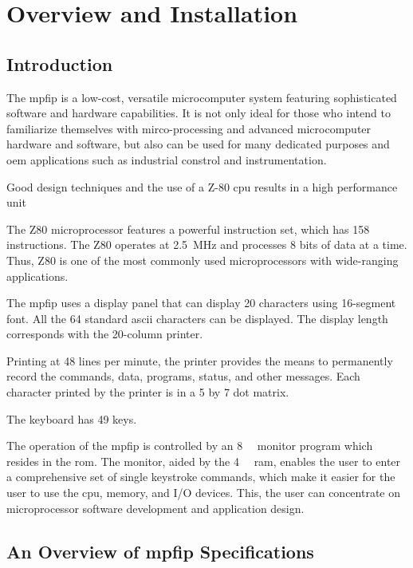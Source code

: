\chapter{Overview and Installation}

\section{Introduction}

The \gls{mpfip} is a low-cost, versatile microcomputer system featuring sophisticated software and hardware capabilities.
It is not only ideal for those who intend to familiarize themselves with mirco-processing and advanced microcomputer hardware and software, but also can be used for many dedicated purposes and \gls{oem} applications such as industrial constrol and instrumentation.

Good design techniques and the use of a Z-80 \gls{cpu} results in a high performance unit

The Z80 microprocessor features a powerful instruction set, which has 158 instructions.
The Z80 operates at \SI{2.5}{\MHz} and processes 8 bits of data at a time. Thus, Z80 is one of the most commonly used microprocessors with wide-ranging applications.

The \gls{mpfip} uses a display panel that can display 20 characters using 16-segment font.
All the 64 standard \gls{ascii} characters can be displayed.
The display length corresponds with the 20-column printer.

Printing at 48 lines per minute, the printer provides the means to permanently record the commands, data, programs, status, and other messages.
Each character printed by the printer is in a 5 by 7 dot matrix.

The keyboard has 49 keys.

The operation of the \gls{mpfip} is controlled by an \SI{8}{\kibi\byte} monitor program which resides in the \gls{rom}.
The monitor, aided by the \SI{4}{\kibi\byte} \gls{ram}, enables the user to enter a comprehensive set of single keystroke commands, which make it easier for the user to use the \gls{cpu}, memory, and I/O devices.
This, the user can concentrate on microprocessor software development and application design.

\clearpage

\section{An Overview of \acrshort{mpfip} Specifications}

